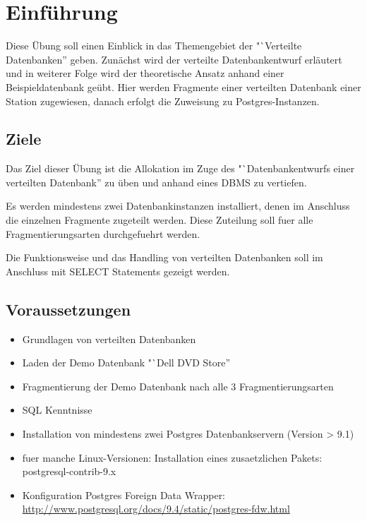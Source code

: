 
\section{Einführung}
Diese Übung soll einen Einblick in das Themengebiet der  "`Verteilte Datenbanken'' geben. Zunächst wird der verteilte Datenbankentwurf erläutert und in weiterer Folge wird der theoretische Ansatz anhand einer Beispieldatenbank geübt. Hier werden Fragmente einer verteilten Datenbank einer Station zugewiesen, danach erfolgt die Zuweisung zu Postgres-Instanzen.

\subsection{Ziele}
Das Ziel dieser Übung ist die Allokation im Zuge des "`Datenbankentwurfs einer verteilten Datenbank'' zu üben und anhand eines DBMS zu vertiefen.

Es werden mindestens zwei Datenbankinstanzen installiert, denen im Anschluss die einzelnen Fragmente zugeteilt werden. Diese Zuteilung soll fuer alle Fragmentierungsarten durchgefuehrt werden.

Die Funktionsweise und das Handling von verteilten Datenbanken soll im Anschluss mit SELECT Statements gezeigt werden.


\subsection{Voraussetzungen}
\begin{itemize}
	\item Grundlagen von verteilten Datenbanken
	\item Laden der Demo Datenbank "`Dell DVD Store''
	\item Fragmentierung der Demo Datenbank nach alle 3 Fragmentierungsarten
	\item SQL Kenntnisse
	\item Installation von mindestens zwei Postgres Datenbankservern (Version > 9.1)
	\item fuer manche Linux-Versionen: Installation eines zusaetzlichen Pakets: postgresql-contrib-9.x
	\item Konfiguration Postgres Foreign Data Wrapper: \url{http://www.postgresql.org/docs/9.4/static/postgres-fdw.html}
\end{itemize}

